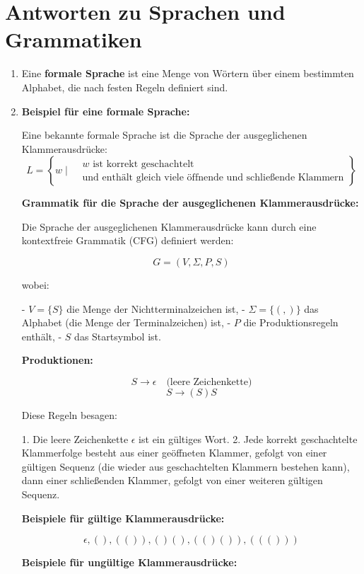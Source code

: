 \documentclass[a4paper,12pt]{article}
\begin{document}
	\section*{Antworten zu Sprachen und Grammatiken}
	\begin{enumerate}
	\item Eine \textbf{formale Sprache} ist eine Menge von Wörtern über einem bestimmten Alphabet, die nach festen Regeln definiert sind.
	\item \textbf{Beispiel für eine formale Sprache:}

	Eine bekannte formale Sprache ist die Sprache der ausgeglichenen Klammerausdrücke:
	\[
	L = \left\{ w \mid 
	\begin{aligned}
		& w \text{ ist korrekt geschachtelt} \\
		& \text{und enthält gleich viele öffnende und schließende Klammern}
	\end{aligned}
	\right\}
	\]
	
	\textbf{Grammatik für die Sprache der ausgeglichenen Klammerausdrücke:}
	
	Die Sprache der ausgeglichenen Klammerausdrücke kann durch eine kontextfreie Grammatik (CFG) definiert werden:
	
	\[
	G = (V, \Sigma, P, S)
	\]
	
	wobei:
	
	- \( V = \{S\} \) die Menge der Nichtterminalzeichen ist,
	- \( \Sigma = \{ (, ) \} \) das Alphabet (die Menge der Terminalzeichen) ist,
	- \( P \) die Produktionsregeln enthält,
	- \( S \) das Startsymbol ist.
	
	\textbf{Produktionen:}
	
	\[
	S \to \epsilon \quad \text{(leere Zeichenkette)}
	\]
	\[
	S \to (S)S
	\]
	
	Diese Regeln besagen:
	
	1. Die leere Zeichenkette \(\epsilon\) ist ein gültiges Wort.
	2. Jede korrekt geschachtelte Klammerfolge besteht aus einer geöffneten Klammer, gefolgt von einer gültigen Sequenz (die wieder aus geschachtelten Klammern bestehen kann), dann einer schließenden Klammer, gefolgt von einer weiteren gültigen Sequenz.
	
	\textbf{Beispiele für gültige Klammerausdrücke:}
	
	\[
	\epsilon, (), (()), ()(), (()()), ((()))
	\]
	
	\textbf{Beispiele für ungültige Klammerausdrücke:}
	

\end{enumerate}
\end{document}
